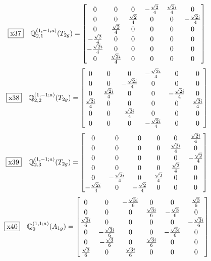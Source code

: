 \documentclass[fleqn,10pt,landscape]{jsarticle}
\begin{document}
\begin{dmath*}
\fbox{x37}\quad \mathbb{Q}_{2,1}^{(1,-1;a)}(T_{2g})=\begin{bmatrix} 0 & 0 & 0 & - \frac{\sqrt{2}}{4} & \frac{\sqrt{2} i}{4} & 0 \\ 0 & 0 & \frac{\sqrt{2}}{4} & 0 & 0 & - \frac{\sqrt{2} i}{4} \\ 0 & \frac{\sqrt{2}}{4} & 0 & 0 & 0 & 0 \\ - \frac{\sqrt{2}}{4} & 0 & 0 & 0 & 0 & 0 \\ - \frac{\sqrt{2} i}{4} & 0 & 0 & 0 & 0 & 0 \\ 0 & \frac{\sqrt{2} i}{4} & 0 & 0 & 0 & 0 \end{bmatrix}
\end{dmath*}
\begin{dmath*}
\fbox{x38}\quad \mathbb{Q}_{2,2}^{(1,-1;a)}(T_{2g})=\begin{bmatrix} 0 & 0 & 0 & - \frac{\sqrt{2} i}{4} & 0 & 0 \\ 0 & 0 & - \frac{\sqrt{2} i}{4} & 0 & 0 & 0 \\ 0 & \frac{\sqrt{2} i}{4} & 0 & 0 & - \frac{\sqrt{2} i}{4} & 0 \\ \frac{\sqrt{2} i}{4} & 0 & 0 & 0 & 0 & \frac{\sqrt{2} i}{4} \\ 0 & 0 & \frac{\sqrt{2} i}{4} & 0 & 0 & 0 \\ 0 & 0 & 0 & - \frac{\sqrt{2} i}{4} & 0 & 0 \end{bmatrix}
\end{dmath*}
\begin{dmath*}
\fbox{x39}\quad \mathbb{Q}_{2,3}^{(1,-1;a)}(T_{2g})=\begin{bmatrix} 0 & 0 & 0 & 0 & 0 & \frac{\sqrt{2} i}{4} \\ 0 & 0 & 0 & 0 & \frac{\sqrt{2} i}{4} & 0 \\ 0 & 0 & 0 & 0 & 0 & - \frac{\sqrt{2}}{4} \\ 0 & 0 & 0 & 0 & \frac{\sqrt{2}}{4} & 0 \\ 0 & - \frac{\sqrt{2} i}{4} & 0 & \frac{\sqrt{2}}{4} & 0 & 0 \\ - \frac{\sqrt{2} i}{4} & 0 & - \frac{\sqrt{2}}{4} & 0 & 0 & 0 \end{bmatrix}
\end{dmath*}
\begin{dmath*}
\fbox{x40}\quad \mathbb{Q}_{0}^{(1,1;a)}(A_{1g})=\begin{bmatrix} 0 & 0 & - \frac{\sqrt{3} i}{6} & 0 & 0 & \frac{\sqrt{3}}{6} \\ 0 & 0 & 0 & \frac{\sqrt{3} i}{6} & - \frac{\sqrt{3}}{6} & 0 \\ \frac{\sqrt{3} i}{6} & 0 & 0 & 0 & 0 & - \frac{\sqrt{3} i}{6} \\ 0 & - \frac{\sqrt{3} i}{6} & 0 & 0 & - \frac{\sqrt{3} i}{6} & 0 \\ 0 & - \frac{\sqrt{3}}{6} & 0 & \frac{\sqrt{3} i}{6} & 0 & 0 \\ \frac{\sqrt{3}}{6} & 0 & \frac{\sqrt{3} i}{6} & 0 & 0 & 0 \end{bmatrix}
\end{dmath*}
\end{document}

